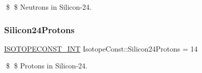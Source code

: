 \$ \$ Neutrons in Silicon-\/24. \mbox{\label{group___isotope_const-_silicon-_si24_gacf5e22ce1834b519a31907c7f5547db1}} 
\subsubsection{\texorpdfstring{Silicon24\+Protons}{Silicon24Protons}}
{\footnotesize\ttfamily \mbox{\hyperlink{group___isotope_const-_macros_ga5f18360b3e99483a35c32d789e62621c}{I\+S\+O\+T\+O\+P\+E\+C\+O\+N\+S\+T\+\_\+\+I\+NT}} Isotope\+Const\+::\+Silicon24\+Protons = 14}

\$ \$ Protons in Silicon-\/24. 